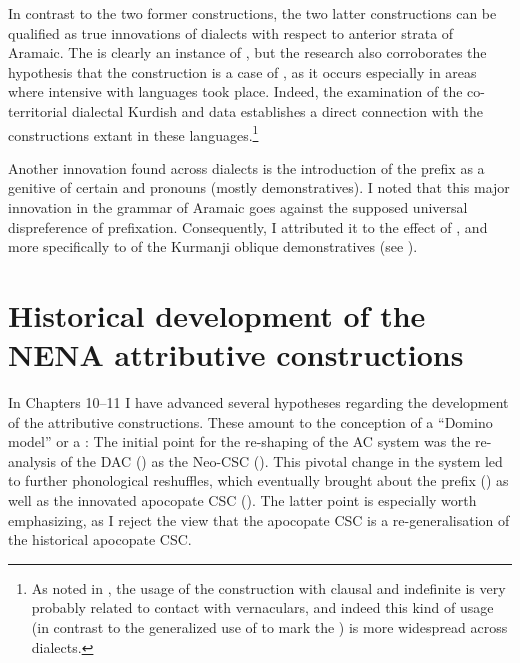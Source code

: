 In contrast to the two former constructions, the two latter constructions can be qualified as true innovations of  dialects with respect to anterior strata of Aramaic. The  is clearly an instance of , but the research also corroborates  the hypothesis that the  construction is a case of , as it occurs especially in areas where intensive  with  languages took place. Indeed, the examination of the co-territorial 	dialectal Kurdish and  data establishes a direct connection with the  constructions extant in these languages.\footnote{As noted in , the usage of the  construction with clausal \secns and indefinite \prims is very probably related to contact with \Arab vernaculars, and indeed this kind of usage (in contrast to the generalized use of  to mark the ) is more widespread across  dialects.} 

Another innovation found across  dialects is the introduction of the \d prefix as a genitive  of certain  and pronouns (mostly demonstratives). I noted that this major innovation in the grammar of Aramaic goes against the supposed universal dispreference of prefixation. Consequently, I attributed it to the effect of , and more specifically to  of the Kurmanji oblique demonstratives (see ). 

\section{Historical development of the NENA attributive constructions} \label{ss:historical}

In Chapters 10--11 I have advanced several hypotheses regarding the development of the  attributive constructions. These amount to the conception of a \enquote{Domino model} or a : The initial point for the re-shaping of the  AC system was the re-analysis of the DAC () as the Neo-CSC (). This pivotal change in the system led to further phonological reshuffles, which eventually brought about the  prefix () as well as the innovated apocopate CSC (). The latter point is especially worth emphasizing, as I reject the view that the apocopate CSC is a re-generalisation of the historical apocopate CSC. 

